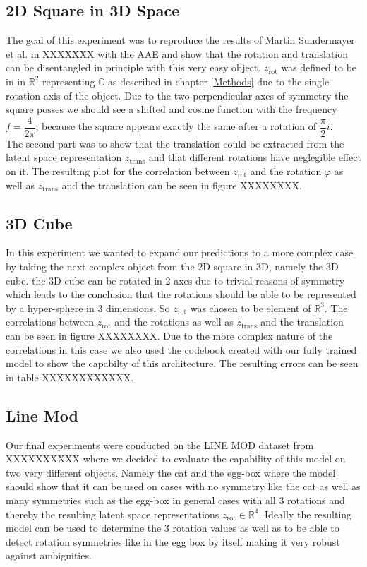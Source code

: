 \documentclass[10pt,a4paper]{article}
\newcommand{\rot}{\ensuremath{\text{rot}\xspace}}
\newcommand{\trans}{\ensuremath{\text{trans}\xspace}}
\begin{document}
\subsection{2D Square in 3D Space}\label{Square}
The goal of this experiment was to reproduce the results of Martin Sundermayer et al. in XXXXXXX with the AAE and show that the rotation and translation can be disentangled in principle with this very easy object. $z_{\rot}$ was defined to be in in $\mathbb{R}^2$ representing $\mathbb{C}$ as described in chapter \ref{Methods} due to the single rotation axis of the object. Due to the two perpendicular axes of symmetry the square posses we should see a shifted and cosine function with the frequency $f = \dfrac{4}{2 \pi}$, because the square appears exactly the same after a rotation of $\dfrac{\pi}{2}i$. \\
The second part was to show that the translation could be extracted from the latent space representation $z_{\trans}$ and that different rotations have neglegible effect on it. The resulting plot for the correlation between $z_{\rot}$ and the rotation $\varphi$ as well as $z_{\trans}$ and the translation can be seen in figure XXXXXXXX.
\newpage
\subsection{3D Cube}\label{Cube}
In this experiment we wanted to expand our predictions to a more complex case by taking the next complex object from the 2D square in 3D, namely the 3D cube. the 3D cube can be rotated in 2 axes due to trivial reasons of symmetry which leads to the conclusion that the rotations should be able to be represented by a hyper-sphere in 3 dimensions. So $z_{\rot}$ was chosen to be element of $\mathbb{R}^3$. The correlations between $z_{\rot}$ and the rotations as well as $z_{\trans}$ and the translation can be seen in figure XXXXXXXX.
Due to the more complex nature of the correlations in this case we also used the codebook created with our fully trained model to show the capabilty of this architecture. The resulting errors can be seen in table XXXXXXXXXXXX.
\newpage
\subsection{Line Mod}
Our final experiments were conducted on the LINE MOD dataset from XXXXXXXXXX where we decided to evaluate the capability of this model on two very different objects. Namely the cat and the egg-box where the model should show that it can be used on cases with no symmetry like the cat as well as many symmetries such as the egg-box in general cases with all 3 rotations and thereby the resulting latent space representations $z_{\rot} \in \mathbb{R}^4$. Ideally the resulting model can be used to determine the 3 rotation values as well as to be able to detect rotation symmetries like in the egg box by itself making it very robust against ambiguities. 
\end{document}
